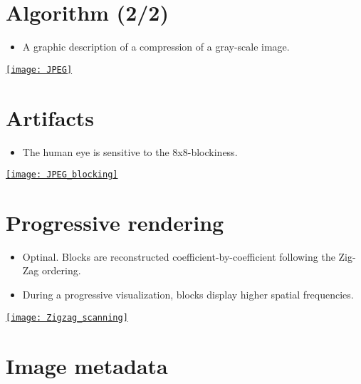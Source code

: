 \section*{Algorithm (2/2)}
\begin{itemize}
\item A graphic description of a compression of a gray-scale image.
\end{itemize}
\vspace{-2ex}
\begin{center}
  \href{https://link.springer.com/article/10.1007/s40799-019-00358-4}{\texttt{[image: JPEG]}}
\end{center}

\section{Artifacts}
\begin{itemize}
\item The human eye is sensitive to the 8x8-blockiness.
\end{itemize}
\vspace{-2ex}
\begin{center}
  \href{https://thesai.org/Publications/ViewPaper?Volume=6&Issue=4&Code=ijacsa&SerialNo=16}{\texttt{[image: JPEG\_blocking]}}
\end{center}

\section{Progressive rendering}
\begin{itemize}
\item Optinal. Blocks are reconstructed coefficient-by-coefficient following the Zig-Zag ordering.
\item During a progressive visualization, blocks display higher
  spatial frequencies.
\end{itemize}
\begin{center}
  \href{https://es.m.wikipedia.org/wiki/Archivo:Zigzag_scanning.jpg}{\texttt{[image: Zigzag\_scanning]}}
\end{center}

\section{Image metadata}